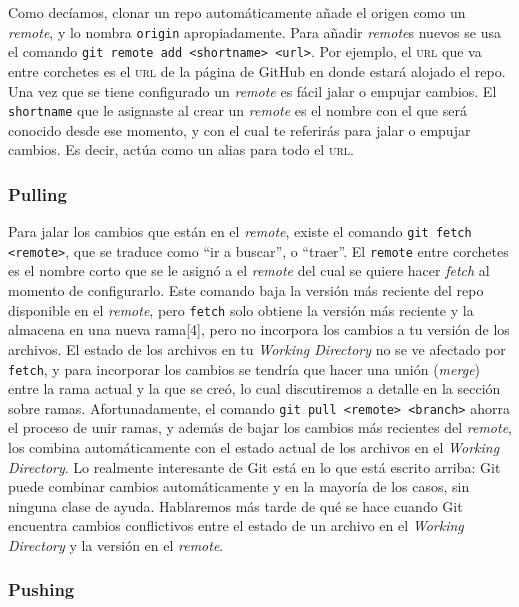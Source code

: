 \documentclass[spanish, 12pt, a4paper]{article}
\begin{document}
Como decíamos, clonar un repo automáticamente añade el origen como un
\emph{remote}, y lo nombra \passthrough{\lstinline!origin!}
apropiadamente. Para añadir \emph{remote}s nuevos se usa el comando
\passthrough{\lstinline!git remote add <shortname> <url>!}. Por ejemplo,
el \textsc{url} que va entre corchetes es el \textsc{url} de la página
de GitHub en donde estará alojado el repo. Una vez que se tiene
configurado un \emph{remote} es fácil jalar o empujar cambios. El
\passthrough{\lstinline!shortname!} que le asignaste al crear un
\emph{remote} es el nombre con el que será conocido desde ese momento, y
con el cual te referirás para jalar o empujar cambios. Es decir, actúa
como un alias para todo el \textsc{url}.

\subsubsection{Pulling}

Para jalar los cambios que están en el \emph{remote}, existe el comando
\passthrough{\lstinline!git fetch <remote>!}, que se traduce como ``ir a
buscar'', o ``traer''. El \passthrough{\lstinline!remote!} entre
corchetes es el nombre corto que se le asignó a el \emph{remote} del
cual se quiere hacer \emph{fetch} al momento de configurarlo. Este
comando baja la versión más reciente del repo disponible en el
\emph{remote}, pero \passthrough{\lstinline!fetch!} solo obtiene la
versión más reciente y la almacena en una nueva rama{[}4{]}, pero no
incorpora los cambios a tu versión de los archivos. El estado de los
archivos en tu \emph{Working Directory} no se ve afectado por
\passthrough{\lstinline!fetch!}, y para incorporar los cambios se
tendría que hacer una unión (\emph{merge}) entre la rama actual y la que
se creó, lo cual discutiremos a detalle en la sección sobre ramas.
Afortunadamente, el comando
\passthrough{\lstinline!git pull <remote> <branch>!} ahorra el proceso
de unir ramas, y además de bajar los cambios más recientes del
\emph{remote}, los combina automáticamente con el estado actual de los
archivos en el \emph{Working Directory}. Lo realmente interesante de Git
está en lo que está escrito arriba: Git puede combinar cambios
automáticamente y en la mayoría de los casos, sin ninguna clase de
ayuda. Hablaremos más tarde de qué se hace cuando Git encuentra cambios
conflictivos entre el estado de un archivo en el \emph{Working
Directory} y la versión en el \emph{remote}.

\subsubsection{Pushing}
\end{document}

